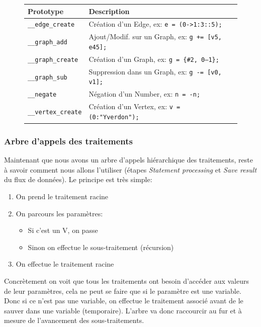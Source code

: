 \documentclass[french]{article}
\begin{document}
		\begin{figure}[H]
			\centering
			\begin{tabular}{lll}
				Prototype & Description\\
				\hline
				\texttt{\_\_edge\_create} & Création d'un Edge, ex: \texttt{e = (0->1:3::5);}\\
				\texttt{\_\_graph\_add} & Ajout/Modif. sur un Graph, ex: \texttt{g += [v5, e45];}\\
				\texttt{\_\_graph\_create} & Création d'un Graph, ex: \texttt{g = \{\#2, 0--1\};}\\
				\texttt{\_\_graph\_sub} & Suppression dans un Graph, ex: \texttt{g -= [v0, v1];}\\
				\texttt{\_\_negate} & Négation d'un Number, ex: \texttt{n = -n;}\\
				\texttt{\_\_vertex\_create} & Création d'un Vertex, ex: \texttt{v = (0:"Yverdon");}\\
			\end{tabular}
		\end{figure}
		
		\subsubsection{Arbre d'appels des traitements}
		\label{subsubsec:arbre-d-appels-des-traitements}
		Maintenant que nous avons un arbre d'appels hiérarchique des traitements, reste à savoir comment nous allons l'utiliser (étapes \textit{Statement processing} et \textit{Save result} du flux de données). Le principe est très simple: 
		
		\begin{enumerate}
			\item On prend le traitement racine
			\item On parcours les paramètres:
			\begin{itemize}
				\item Si c'est un V, on passe
				\item Sinon on effectue le sous-traitement (récursion)
			\end{itemize}
			\item On effectue le traitement racine
		\end{enumerate}
		
		Concrètement on voit que tous les traitements ont besoin d'accéder aux valeurs de leur paramètres, cela ne peut se faire que si le paramètre est une variable. Donc si ce n'est pas une variable, on effectue le traitement associé avant de le sauver dans une variable (temporaire). L'arbre va donc raccourcir au fur et à mesure de l'avancement des sous-traitements.\\
		
\end{document}

